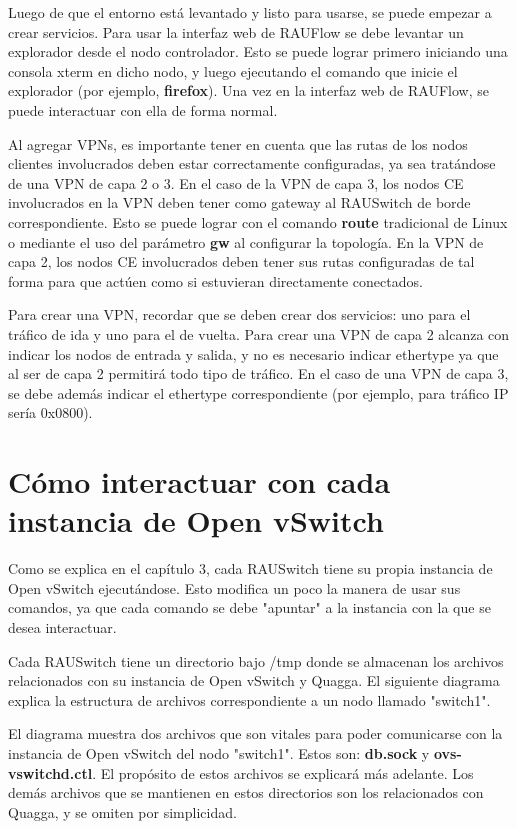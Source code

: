 Luego de que el entorno está levantado y listo para usarse, se puede empezar a crear servicios. Para usar la interfaz web de RAUFlow se debe levantar un explorador desde el nodo controlador. Esto se puede lograr primero iniciando una consola xterm en dicho nodo, y luego ejecutando el comando que inicie el explorador (por ejemplo, \textbf{firefox}). Una vez en la interfaz web de RAUFlow, se puede interactuar con ella de forma normal.

Al agregar VPNs, es importante tener en cuenta que las rutas de los nodos clientes involucrados deben estar correctamente configuradas, ya sea tratándose de una VPN de capa 2 o 3. En el caso de la VPN de capa 3, los nodos CE involucrados en la VPN deben tener como gateway al RAUSwitch de borde correspondiente. Esto se puede lograr con el comando \textbf{route} tradicional de Linux o mediante el uso del parámetro \textbf{gw} al configurar la topología. En la VPN de capa 2, los nodos CE involucrados deben tener sus rutas configuradas de tal forma para que actúen como si estuvieran directamente conectados.

Para crear una VPN, recordar que se deben crear dos servicios: uno para el tráfico de ida y uno para el de vuelta. Para crear una VPN de capa 2 alcanza con indicar los nodos de entrada y salida, y no es necesario indicar ethertype ya que al ser de capa 2 permitirá todo tipo de tráfico. En el caso de una VPN de capa 3, se debe además indicar el ethertype correspondiente (por ejemplo, para tráfico IP sería 0x0800).

\section{Cómo interactuar con cada instancia de Open vSwitch}
Como se explica en el capítulo 3, cada RAUSwitch tiene su propia instancia de Open vSwitch ejecutándose. Esto modifica un poco la manera de usar sus comandos, ya que cada comando se debe "apuntar" a la instancia con la que se desea interactuar.

Cada RAUSwitch tiene un directorio bajo /tmp donde se almacenan los archivos relacionados con su instancia de Open vSwitch y Quagga. El siguiente diagrama explica la estructura de archivos correspondiente a un nodo llamado "switch1". 

El diagrama muestra dos archivos que son vitales para poder comunicarse con la instancia de Open vSwitch del nodo "switch1". Estos son: \textbf{db.sock} y \textbf{ovs-vswitchd.ctl}. El propósito de estos archivos se explicará más adelante. Los demás archivos que se mantienen en estos directorios son los relacionados con Quagga, y se omiten por simplicidad.

